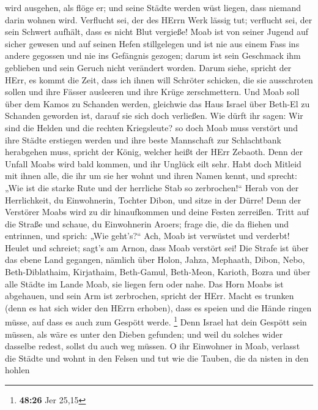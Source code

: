 wird ausgehen, als flöge er; und seine Städte werden wüst liegen, dass
niemand darin wohnen wird.  Verflucht sei, der des HErrn
Werk lässig tut; verflucht sei, der sein Schwert aufhält, dass es nicht
Blut vergieße!  Moab ist von seiner Jugend auf sicher
gewesen und auf seinen Hefen stillgelegen und ist nie aus einem Fass ins
andere gegossen und nie ins Gefängnis gezogen; darum ist sein Geschmack
ihm geblieben und sein Geruch nicht verändert worden. 
Darum siehe, spricht der HErr, es kommt die Zeit, dass ich ihnen will
Schröter schicken, die sie ausschroten sollen und ihre Fässer ausleeren
und ihre Krüge zerschmettern.  Und Moab soll über dem Kamos
zu Schanden werden, gleichwie das Haus Israel über Beth-El zu Schanden
geworden ist, darauf sie sich doch verließen.  Wie dürft
ihr sagen: Wir sind die Helden und die rechten Kriegsleute?
 so doch Moab muss verstört und ihre Städte erstiegen
werden und ihre beste Mannschaft zur Schlachtbank herabgehen muss,
spricht der König, welcher heißt der HErr Zebaoth.  Denn
der Unfall Moabs wird bald kommen, und ihr Unglück eilt sehr.
 Habt doch Mitleid mit ihnen alle, die ihr um sie her wohnt
und ihren Namen kennt, und sprecht: „Wie ist die starke Rute und der
herrliche Stab so zerbrochen!{}``  Herab von der
Herrlichkeit, du Einwohnerin, Tochter Dibon, und sitze in der Dürre!
Denn der Verstörer Moabs wird zu dir hinaufkommen und deine Festen
zerreißen.  Tritt auf die Straße und schaue, du Einwohnerin
Aroers; frage die, die da fliehen und entrinnen, und sprich: „Wie
geht's?{}``  Ach, Moab ist verwüstet und verderbt! Heulet
und schreiet; sagt's am Arnon, dass Moab verstört sei!  Die
Strafe ist über das ebene Land gegangen, nämlich über Holon, Jahza,
Mephaath,  Dibon, Nebo, Beth-Diblathaim, 
Kirjathaim, Beth-Gamul, Beth-Meon,  Karioth, Bozra und über
alle Städte im Lande Moab, sie liegen fern oder nahe.  Das
Horn Moabs ist abgehauen, und sein Arm ist zerbrochen, spricht der HErr.
 Macht es trunken (denn es hat sich wider den HErrn
erhoben), dass es speien und die Hände ringen müsse, auf dass es auch
zum Gespött werde. \footnote{\textbf{48:26} Jer 25,15} 
Denn Israel hat dein Gespött sein müssen, als wäre es unter den Dieben
gefunden; und weil du solches wider dasselbe redest, sollst du auch weg
müssen.  O ihr Einwohner in Moab, verlasst die Städte und
wohnt in den Felsen und tut wie die Tauben, die da nisten in den hohlen
